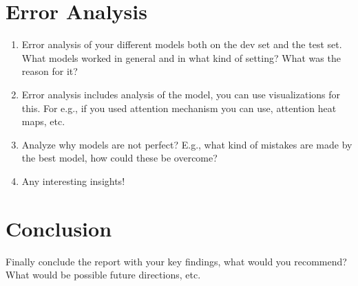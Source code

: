 \documentclass[11pt, oneside]{article}   	%
\begin{document}
\section{Error Analysis}

\begin{enumerate}
\item Error analysis of your different models both on the dev set and the test set. What models worked in general and in what kind of setting? What was the reason for it?
\item Error analysis includes analysis of the model, you can use visualizations for this. For e.g., if you used attention mechanism you can use, attention heat maps, etc. 
\item Analyze why models are not perfect? E.g., what kind of mistakes are made by the best model, how could these be overcome?
\item Any interesting insights! 
\end{enumerate}

\section{Conclusion} 

Finally conclude the report with your key findings, what would you recommend? What would be possible future directions, etc. 
 
 

\end{document}
